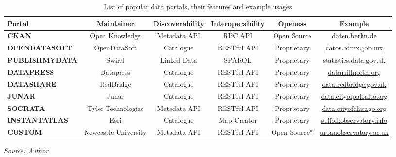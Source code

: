 \begin{table}[hbt!]
\scriptsize
\centering
\begin{tabular}{|l|c|c|c|c|c|}
\hline
\textbf{Portal} & \textbf{Maintainer} & \textbf{Discoverability} & \textbf{Interoperability} & \textbf{Openess} & \textbf{Example}\\[0.5ex]
\hline
\rowcolor[gray]{.9}\textbf{CKAN} 		& Open Knowledge 	& Metadata API & RPC API & Open Source & \href{https://daten.berlin.de}{daten.berlin.de} \\
\hline
\textbf{OPENDATASOFT} 		& OpenDataSoft	& Catalogue & RESTful API & Proprietary & \href{https://datos.cdmx.gob.mx}{datos.cdmx.gob.mx}  \\
\hline
\rowcolor[gray]{.9}\textbf{PUBLISHMYDATA}	& Swirrl	& Linked Data & SPARQL & Proprietary & \href{http://statistics.data.gov.uk/}{statistics.data.gov.uk} \\
\hline
\textbf{DATAPRESS}			& Datapress  	& Catalogue & RESTful API & Proprietary & \href{https://datamillnorth.org}{datamillnorth.org} \\
\hline
\rowcolor[gray]{.9}\textbf{DATASHARE}	& RedBridge  & Catalogue & RESTful API & Proprietary & \href{https://data.redbridge.gov.uk}{data.redbridge.gov.uk} \\
\hline
\textbf{JUNAR}	& Junar	& Catalogue & RESTful API & Proprietary & \href{https://data.cityofpaloalto.org}{data.cityofpaloalto.org} \\
\hline
\rowcolor[gray]{.9}\textbf{SOCRATA}	& Tyler Technologies  & Metadata API & RESTful API & Proprietary & \href{https://data.cityofchicago.org}{data.cityofchicago.org} \\
\hline
\textbf{INSTANTATLAS}	& Esri 	& Catalogue & Map Creator & Proprietary & \href{https://www.suffolkobservatory.info}{suffolkobservatory.info} \\
\hline
\rowcolor[gray]{.9}\textbf{CUSTOM}	& Newcastle University 	& Metadata API & RESTful API & Open Source* & \href{https://urbanobservatory.ac.uk}{urbanobservatory.ac.uk} \\ [0.5ex]
\hline
\end{tabular}

\smallskip\centering
  \footnotesize\emph{Source: Author}
\caption[Data Portals]{List of popular data portals, their features and example usages}
\label{table:data_portals}
\end{table}

